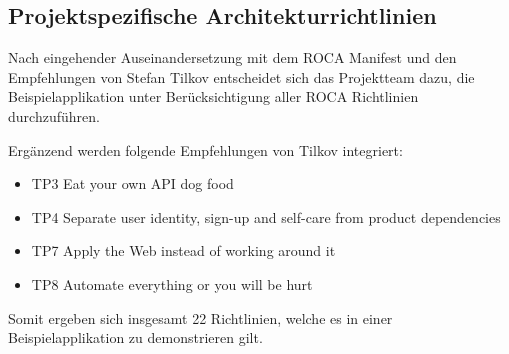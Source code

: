 \subsection{Projektspezifische Architekturrichtlinien}
Nach eingehender Auseinandersetzung mit dem ROCA Manifest und den Empfehlungen von Stefan Tilkov entscheidet sich das Projektteam dazu, die Beispielapplikation unter Berücksichtigung aller ROCA Richtlinien durchzuführen.

Ergänzend werden folgende Empfehlungen von Tilkov integriert:

\begin{itemize}
	\item TP3 Eat your own API dog food
	\item TP4 Separate user identity, sign-up and self-care from product dependencies
	\item TP7 Apply the Web instead of working around it
	\item TP8 Automate everything or you will be hurt
\end{itemize}

Somit ergeben sich insgesamt 22 Richtlinien, welche es in einer Beispielapplikation zu demonstrieren gilt.







